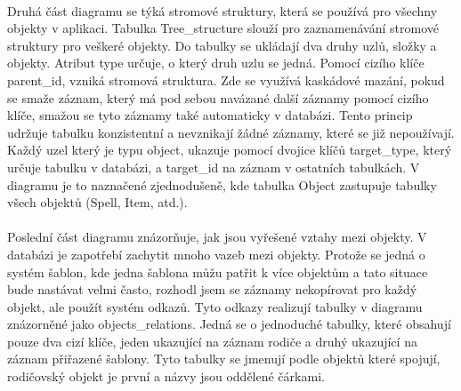 \documentclass[thesis=B,czech]{resources/FITthesis}[2012/06/26]
\begin{document}
\\
Druhá část diagramu se týká stromové struktury, která se používá pro všechny objekty v aplikaci. Tabulka Tree\_structure slouží pro zaznamenávání stromové struktury pro veškeré objekty. Do tabulky se ukládají dva druhy uzlů, složky a objekty. Atribut type určuje, o který druh uzlu se jedná. Pomocí cizího klíče parent\_id, vzniká stromová struktura. Zde se využívá kaskádové mazání, pokud se smaže záznam, který má pod sebou navázané další záznamy pomocí cizího klíče, smažou se tyto záznamy také automaticky v databázi. Tento princip udržuje tabulku konzistentní a nevznikají žádné záznamy, které se již nepoužívají. Každý uzel který je typu object, ukazuje pomocí dvojice klíčů target\_type, který určuje tabulku v databázi, a target\_id na záznam v ostatních tabulkách. V diagramu je to naznačené zjednodušeně, kde tabulka Object zastupuje tabulky všech objektů (Spell, Item, atd.). \\
\\
Poslední část diagramu znázorňuje, jak jsou vyřešené vztahy mezi objekty. V databázi je zapotřebí zachytit mnoho vazeb mezi objekty. Protože se jedná o systém šablon, kde jedna šablona můžu patřit k více objektům a tato situace bude nastávat velmi často, rozhodl jsem se záznamy nekopírovat pro každý objekt, ale použít systém odkazů. Tyto odkazy realizují tabulky v diagramu znázorněné jako objects\_relations. Jedná se o jednoduché tabulky, které obsahují pouze dva cizí klíče, jeden ukazující na záznam rodiče a druhý ukazující na záznam přiřazené šablony. Tyto tabulky se jmenují podle objektů které spojují, rodičovský objekt je první a názvy jsou oddělené čárkami.
\end{document}
